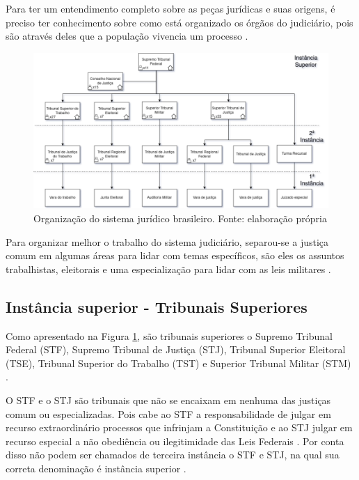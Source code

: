 Para ter um entendimento completo sobre as peças jurídicas e suas origens, é preciso ter conhecimento sobre como está organizado os órgãos do judiciário, pois são através deles que a população vivencia um processo \cite{JUNIOR2012}.

\begin{figure}[h]
	\centering
    \includegraphics[keepaspectratio=true,scale=0.4]{figuras/sistemaJudiciario}
	\caption[Sistema judiciário]{Organização do sistema jurídico brasileiro. Fonte: elaboração própria}
	\label{fig:sistemaJudiciario}
\end{figure}

Para organizar melhor o trabalho do sistema judiciário, separou-se a justiça comum em algumas áreas para lidar com temas específicos, são eles os assuntos trabalhistas, eleitorais e uma especialização para lidar com as leis militares \cite{JUNIOR2012}. 

\subsection{Instância superior - Tribunais Superiores}

Como apresentado na Figura \ref{fig:sistemaJudiciario}, são tribunais superiores o Supremo Tribunal Federal (STF), Supremo Tribunal de Justiça (STJ), Tribunal Superior Eleitoral (TSE), Tribunal Superior do Trabalho (TST) e Superior Tribunal Militar (STM) \cite{BRASIL1988}.

O STF e o STJ são tribunais que não se encaixam em nenhuma das justiças comum ou especializadas. Pois cabe ao STF a responsabilidade de julgar em recurso extraordinário processos que infrinjam a Constituição e ao STJ julgar em recurso especial a não obediência ou ilegitimidade das Leis Federais \cite{BRASIL1988}. Por conta disso não podem ser chamados de terceira instância o STF e STJ, na qual sua correta denominação é instância superior \cite{JUNIOR2012}.

